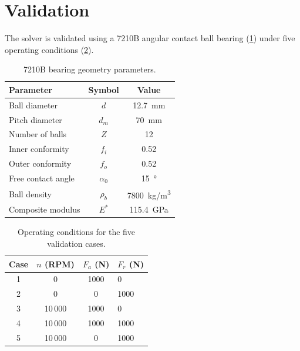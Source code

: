 \documentclass[preprint,12pt]{elsarticle}
\begin{document}
\section{Validation}
\label{sec:validation}

The solver is validated using a 7210B angular contact ball bearing (\cref{tab:geometry}) under five operating conditions (\cref{tab:conditions}).

\begin{table}[htbp]
    \centering
    \caption{7210B bearing geometry parameters.}
    \label{tab:geometry}
    \begin{tabular}{@{}lcc@{}}
        \toprule
        Parameter & Symbol & Value \\
        \midrule
        Ball diameter & $d$ & \SI{12.7}{mm} \\
        Pitch diameter & $d_m$ & \SI{70}{mm} \\
        Number of balls & $Z$ & 12 \\
        Inner conformity & $f_i$ & 0.52 \\
        Outer conformity & $f_o$ & 0.52 \\
        Free contact angle & $\alpha_0$ & \SI{15}{\degree} \\
        Ball density & $\rho_b$ & \SI{7800}{kg/m^3} \\
        Composite modulus & $E^*$ & \SI{115.4}{GPa} \\
        \bottomrule
    \end{tabular}
\end{table}

\begin{table}[htbp]
    \centering
    \caption{Operating conditions for the five validation cases.}
    \label{tab:conditions}
    \begin{tabular}{@{}cccl@{}}
        \toprule
        Case & $n$ (RPM) & $F_a$ (N) & $F_r$ (N) \\
        \midrule
        1 & 0 & 1000 & 0 \\
        2 & 0 & 0 & 1000 \\
        3 & 10\,000 & 1000 & 0 \\
        4 & 10\,000 & 1000 & 1000 \\
        5 & 10\,000 & 0 & 1000 \\
        \bottomrule
    \end{tabular}
\end{table}
\end{document}
